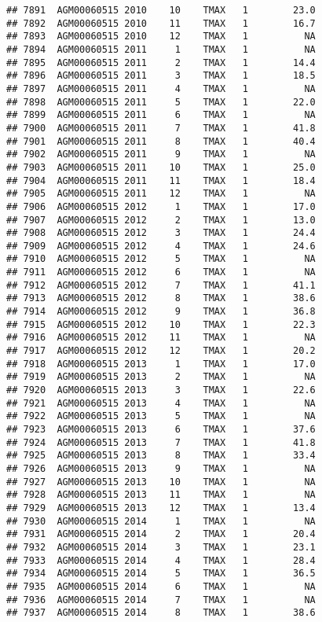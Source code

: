\documentclass{article}\usepackage[]{graphicx}\usepackage[]{color}
\makeatletter
\newenvironment{kframe}{%
 \def\at@end@of@kframe{}%
 \ifinner\ifhmode%
  \def\at@end@of@kframe{\end{minipage}}%
  \begin{minipage}{\columnwidth}%
 \fi\fi%
 \def\FrameCommand##1{\hskip\@totalleftmargin \hskip-\fboxsep
 \colorbox{shadecolor}{##1}\hskip-\fboxsep
     \hskip-\linewidth \hskip-\@totalleftmargin \hskip\columnwidth}%
 \MakeFramed {\advance\hsize-\width
   \@totalleftmargin\z@ \linewidth\hsize
   \@setminipage}}%
 {\par\unskip\endMakeFramed%
 \at@end@of@kframe}
\newenvironment{knitrout}{}{} %
\makeatother
\begin{document}
\begin{knitrout}
\begin{kframe}
\begin{verbatim}
## 7891  AGM00060515 2010    10    TMAX   1        23.0
## 7892  AGM00060515 2010    11    TMAX   1        16.7
## 7893  AGM00060515 2010    12    TMAX   1          NA
## 7894  AGM00060515 2011     1    TMAX   1          NA
## 7895  AGM00060515 2011     2    TMAX   1        14.4
## 7896  AGM00060515 2011     3    TMAX   1        18.5
## 7897  AGM00060515 2011     4    TMAX   1          NA
## 7898  AGM00060515 2011     5    TMAX   1        22.0
## 7899  AGM00060515 2011     6    TMAX   1          NA
## 7900  AGM00060515 2011     7    TMAX   1        41.8
## 7901  AGM00060515 2011     8    TMAX   1        40.4
## 7902  AGM00060515 2011     9    TMAX   1          NA
## 7903  AGM00060515 2011    10    TMAX   1        25.0
## 7904  AGM00060515 2011    11    TMAX   1        18.4
## 7905  AGM00060515 2011    12    TMAX   1          NA
## 7906  AGM00060515 2012     1    TMAX   1        17.0
## 7907  AGM00060515 2012     2    TMAX   1        13.0
## 7908  AGM00060515 2012     3    TMAX   1        24.4
## 7909  AGM00060515 2012     4    TMAX   1        24.6
## 7910  AGM00060515 2012     5    TMAX   1          NA
## 7911  AGM00060515 2012     6    TMAX   1          NA
## 7912  AGM00060515 2012     7    TMAX   1        41.1
## 7913  AGM00060515 2012     8    TMAX   1        38.6
## 7914  AGM00060515 2012     9    TMAX   1        36.8
## 7915  AGM00060515 2012    10    TMAX   1        22.3
## 7916  AGM00060515 2012    11    TMAX   1          NA
## 7917  AGM00060515 2012    12    TMAX   1        20.2
## 7918  AGM00060515 2013     1    TMAX   1        17.0
## 7919  AGM00060515 2013     2    TMAX   1          NA
## 7920  AGM00060515 2013     3    TMAX   1        22.6
## 7921  AGM00060515 2013     4    TMAX   1          NA
## 7922  AGM00060515 2013     5    TMAX   1          NA
## 7923  AGM00060515 2013     6    TMAX   1        37.6
## 7924  AGM00060515 2013     7    TMAX   1        41.8
## 7925  AGM00060515 2013     8    TMAX   1        33.4
## 7926  AGM00060515 2013     9    TMAX   1          NA
## 7927  AGM00060515 2013    10    TMAX   1          NA
## 7928  AGM00060515 2013    11    TMAX   1          NA
## 7929  AGM00060515 2013    12    TMAX   1        13.4
## 7930  AGM00060515 2014     1    TMAX   1          NA
## 7931  AGM00060515 2014     2    TMAX   1        20.4
## 7932  AGM00060515 2014     3    TMAX   1        23.1
## 7933  AGM00060515 2014     4    TMAX   1        28.4
## 7934  AGM00060515 2014     5    TMAX   1        36.5
## 7935  AGM00060515 2014     6    TMAX   1          NA
## 7936  AGM00060515 2014     7    TMAX   1          NA
## 7937  AGM00060515 2014     8    TMAX   1        38.6

\end{verbatim}
\end{kframe}
\end{knitrout}
\end{document}

